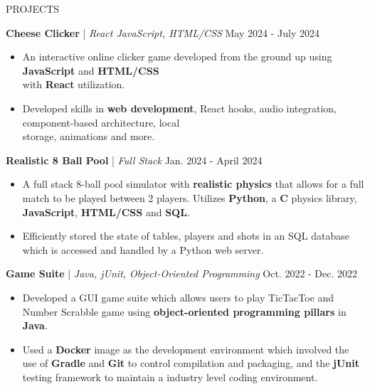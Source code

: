 \begin{rSection}{PROJECTS}

\quad\textbf{Cheese Clicker} | \textit{React JavaScript, HTML/CSS } \hfill May 2024 - July 2024\\
\renewcommand\labelitemi{$\vcenter{\hbox{\tiny$\bullet$}}$}
\begin{itemize}
    \itemsep -4pt {} \vspace{-1.5em}
        \item An interactive online clicker game developed from the ground up using \textbf{JavaScript} and \textbf{HTML/CSS} \\ with \textbf{React} utilization.
        \item Developed skills in \textbf{web development}, React hooks, audio integration, component-based architecture, local \\ storage, animations and more.
\end{itemize}

\quad\textbf{Realistic 8 Ball Pool} | \textit{Full Stack} \hfill Jan. 2024 - April 2024\\
\renewcommand\labelitemi{$\vcenter{\hbox{\tiny$\bullet$}}$}
\begin{itemize}
    \itemsep -4pt {} \vspace{-1.5em} 
        \item A full stack 8-ball pool simulator with \textbf{realistic physics} that allows for a full match to be played between 2 players. Utilizes \textbf{Python}, a \textbf{C} physics library, \textbf{JavaScript}, \textbf{HTML/CSS} and \textbf{SQL}.
        \item Efficiently stored the state of tables, players and shots in an SQL database which is accessed and handled by a Python web server.
\end{itemize}

\quad\textbf{Game Suite} | \textit{Java, jUnit, Object-Oriented Programming } \hfill Oct. 2022 - Dec. 2022\\
\renewcommand\labelitemi{$\vcenter{\hbox{\tiny$\bullet$}}$}
\begin{itemize}
    \itemsep -4pt {} \vspace{-1.5em} 
        \item Developed a GUI game suite which allows users to play TicTacToe and Number Scrabble game using \textbf{object-oriented programming pillars} in \textbf{Java}.
        \item Used a \textbf{Docker} image as the development environment which involved the use of 
         \textbf{Gradle} and \textbf{Git} to control compilation and packaging, and the \textbf{jUnit} testing framework to maintain a industry level coding environment.
\end{itemize}

\end{rSection} 
